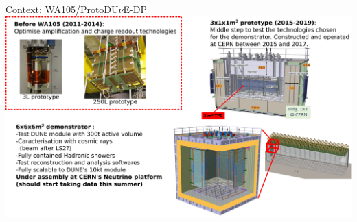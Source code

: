\documentclass[10pt]{beamer}
\begin{document}
    \begin{frame}{Context: WA105/\texorpdfstring{ProtoDU$\nu$E}{ProtoDUNE}-DP}
		\includegraphics[width=\linewidth]{figures/contexte/wa105}\\
    \end{frame}
    
\end{document}
